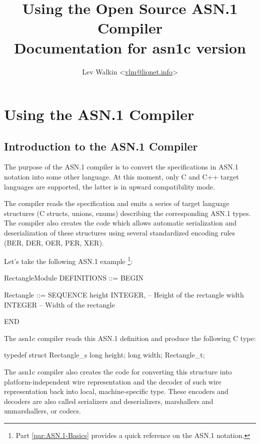 \documentclass[english,oneside,12pt]{book}
\begin{document}
\title{Using the Open Source ASN.1 Compiler\\
\vspace*{0.4cm}
\Large Documentation for asn1c version \asnver{}}
\author{Lev Walkin <\href{mailto:vlm@lionet.info?Subject=asn1c}{vlm@lionet.info}>}

\pagestyle{fancy}
\fancyhead[L]{\leftmark}
\maketitle

\tableofcontents{}

\part{Using the ASN.1 Compiler}


\chapter{Introduction to the ASN.1 Compiler}

The purpose of the ASN.1 compiler is to convert the specifications
in ASN.1 notation into some other language. At this moment, only C
and C++ target languages are supported, the latter is in upward compatibility
mode.

The compiler reads the specification and emits a series of target
language structures (C structs, unions, enums) describing the corresponding
ASN.1 types. The compiler also creates the code which allows automatic
serialization and deserialization of these structures using several
standardized encoding rules (BER, DER, OER, PER, XER).

Let's take the following ASN.1 example%
\footnote{Part \ref{par:ASN.1-Basics} provides a quick reference
on the ASN.1 notation.}:
\begin{asn}
RectangleModule DEFINITIONS ::= BEGIN

Rectangle ::= SEQUENCE {
    height  INTEGER,        -- Height of the rectangle
    width   INTEGER         -- Width of the rectangle
}

END
\end{asn}
The asn1c compiler reads this ASN.1 definition and produce the following
C type:
\begin{codesample}
typedef struct Rectangle_s {
    long height;
    long width;
} Rectangle_t;
\end{codesample}
The asn1c compiler also creates the code for converting this structure into
platform-independent wire representation and the decoder
of such wire representation back into local, machine-specific type.
These encoders and decoders are also called serializers and deserializers,
marshallers and unmarshallers, or codecs.
\end{document}
